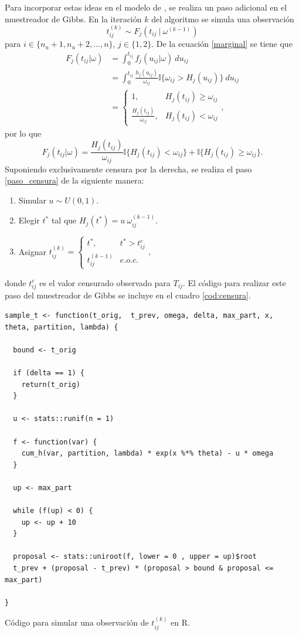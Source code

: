 \documentclass[11pt,a4paper]{article}
\begin{document}
Para incorporar estas ideas en el modelo de \citet{nieto}, se realiza un paso adicional en el muestreador de Gibbs. En la iteración $k$ del algoritmo se simula una observación
\begin{equation} \label{paso_censura}
t_{ij}^{(k)} \sim F_j(t_{ij} \ | \  \omega^{(k-1)})
\end{equation}
para $ i \in \lbrace n_u+1, n_u + 2, \dots, n \rbrace$, $j \in \lbrace 1, 2 \rbrace.$ De la ecuación \eqref{marginal} se tiene que
\begin{align*}
F_j(t_{ij} | \omega) &= \int_0^{t_{ij}} f_j(u_{ij}|\omega) \ du_{ij}\\
&= \int_0^{t_{ij}} \frac{h_j(u_{ij})}{\omega_{ij}} \mathbb{I}\lbrace \omega_{ij} > H_j(u_{ij}) \rbrace \ du_{ij}\\
&= \begin{cases} 
      1, & H_j(t_{ij}) \geq \omega_{ij}\\
      \frac{H_j(t_{ij})}{\omega_{ij}}, & H_j(t_{ij}) < \omega_{ij}
   \end{cases},
\end{align*}
por lo que $$F_j(t_{ij} | \omega) = \frac{H_j(t_{ij})}{\omega_{ij}} \mathbb{I} \lbrace H_j(t_{ij}) < \omega_{ij} \rbrace + \mathbb{I}\lbrace H_j(t_{ij}) \geq \omega_{ij} \rbrace.$$ Suponiendo exclusivamente censura por la derecha, se realiza el paso \eqref{paso_censura} de la siguiente manera:
\begin{enumerate}
\item Simular $u\sim U(0,1)$.
\item Elegir $t^*$ tal que $H_j(t^*) = u \ \omega_{ij}^{(k-1)}.$
\item Asignar $t_{ij}^{(k)} = 
\begin{cases}
t^*, & t^* > t_{ij}^c\\
t_{ij}^{(k-1)} & e.o.c.
\end{cases},$
\end{enumerate}
donde $t_{ij}^c$ es el valor censurado observado para $T_{ij}$. El código para realizar este paso del muestreador de Gibbs se incluye en el cuadro \ref{cod:censura}.

\begin{table}[htb]
\begin{lstlisting}
sample_t <- function(t_orig,  t_prev, omega, delta, max_part, x, theta, partition, lambda) {

  bound <- t_orig

  if (delta == 1) {
    return(t_orig)
  }

  u <- stats::runif(n = 1)

  f <- function(var) {
    cum_h(var, partition, lambda) * exp(x %*% theta) - u * omega
  }

  up <- max_part

  while (f(up) < 0) {
    up <- up + 10
  }

  proposal <- stats::uniroot(f, lower = 0 , upper = up)$root
  t_prev + (proposal - t_prev) * (proposal > bound & proposal <= max_part)

}
\end{lstlisting}
\caption{Código para simular una observación de $t_{ij}^{(k)}$ en R.}
\label{cod:censura}
\end{table}
\end{document}

